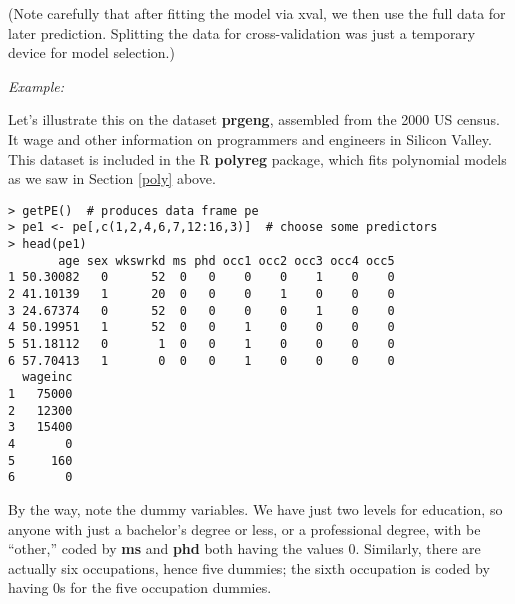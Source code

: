 (Note carefully that after fitting the model via xval, we then use the
full data for later prediction.  Splitting the data for cross-validation
was just a temporary device for model selection.)

\textit{Example:}

Let's illustrate this on the dataset \textbf{prgeng}, assembled from the
2000 US census.  It wage and other information on programmers and
engineers in Silicon Valley.  This dataset is included in the R
\textbf{polyreg} package, which fits polynomial models as we saw in
Section \ref{poly} above.

\begin{lstlisting}
> getPE()  # produces data frame pe
> pe1 <- pe[,c(1,2,4,6,7,12:16,3)]  # choose some predictors
> head(pe1)
       age sex wkswrkd ms phd occ1 occ2 occ3 occ4 occ5
1 50.30082   0      52  0   0    0    0    1    0    0
2 41.10139   1      20  0   0    0    1    0    0    0
3 24.67374   0      52  0   0    0    0    1    0    0
4 50.19951   1      52  0   0    1    0    0    0    0
5 51.18112   0       1  0   0    1    0    0    0    0
6 57.70413   1       0  0   0    1    0    0    0    0
  wageinc
1   75000
2   12300
3   15400
4       0
5     160
6       0
\end{lstlisting}

By the way, note the dummy variables.  We have just two levels for
education, so anyone with just a bachelor's degree or less, or a
professional degree, with be ``other,'' coded by \textbf{ms} and
\textbf{phd} both having the values 0.  Similarly, there are actually
six occupations, hence five dummies; the sixth occupation is coded by
having 0s for the five occupation dummies.

